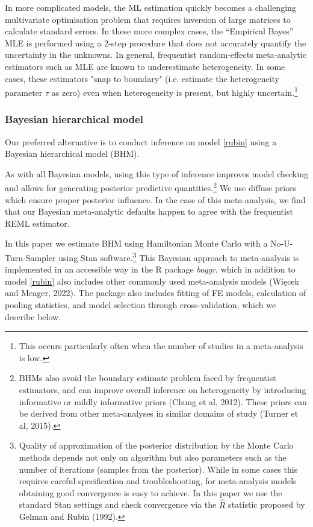 \documentclass[12pt]{article}
\begin{document}
In more complicated models, the ML estimation quickly becomes a challenging multivariate optimisation problem that requires inversion of large matrices to calculate standard errors. In these more complex cases, the ``Empirical Bayes'' MLE is performed using a 2-step procedure that does not accurately quantify the uncertainty in the unknowns. In general, frequentist random-effects meta-analytic estimators such as MLE are known to underestimate heterogeneity. In some cases, these estimators "snap to boundary" (i.e. estimate the heterogeneity parameter $\tau$ as zero) even when heterogeneity is present, but highly uncertain.\footnote{This occurs particularly often when the number of studies in a meta-analysis is low.}

\subsubsection*{Bayesian hierarchical model}

Our preferred alternative is to conduct inference on model \eqref{rubin} using a Bayesian hierarchical model (BHM). 

As with all Bayesian models, using this type of inference improves model checking and allows for generating posterior predictive quantities.\footnote{BHMs also avoid the boundary estimate problem faced by frequentist estimators, and can improve overall inference on heterogeneity by introducing informative or mildly informative priors (Chung et al, 2012). These priors can be derived from other meta-analyses in similar domains of study (Turner et al, 2015).} We use diffuse priors which ensure proper posterior influence. In the case of this meta-analysis, we find that our Bayesian meta-analytic defaults happen to agree with the frequentist REML estimator.

In this paper we estimate BHM using Hamiltonian Monte Carlo with a No-U-Turn-Sampler using Stan software.\footnote{Quality of approximation of the posterior distribution by the Monte Carlo methods depends not only on algorithm but also parameters such as the number of iterations (samples from the posterior). While in some cases this requires careful specification and troubleshooting, for meta-analysis models obtaining good convergence is easy to achieve. In this paper we use the standard Stan settings and check convergence via the $\hat{R}$ statistic proposed by Gelman and Rubin (1992).} This Bayesian approach to meta-analysis is implemented in an accessible way in the R package \textit{baggr}, which in addition to model \eqref{rubin} also includes other commonly used meta-analysis models (Więcek and Meager, 2022). The package also includes fitting of FE models, calculation of pooling statistics, and model selection through cross-validation, which we describe below.
\end{document}
